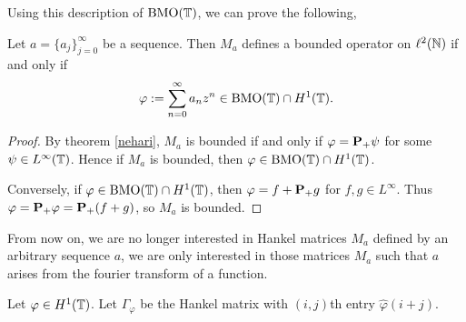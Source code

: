 Using this description of $\operatorname{BMO}(\mathbb{T})$, we can prove the following,
\begin{corollary}
    Let $a = \{a_j\}_{j=0}^\infty$ be a sequence. Then $M_a$ defines
    a bounded operator on $\ell^2(\mathbb{N})$ if and only if
    \begin{equation*}
        \varphi := \sum_{n=0}^\infty a_n z^n \in \operatorname{BMO}(\mathbb{T})\cap H^1(\mathbb{T}).
    \end{equation*}
\end{corollary}
\begin{proof}
    By theorem \ref{nehari}, $M_a$ is bounded if and only if $\varphi = \mathbf{P}_+\psi$
    for some $\psi \in L^\infty(\mathbb{T})$. Hence if $M_a$ is bounded,
    then $\varphi \in \operatorname{BMO}(\mathbb{T})\cap H^1(\mathbb{T})$. 
    
    Conversely, if $\varphi \in \operatorname{BMO}(\mathbb{T})\cap H^1(\mathbb{T})$,
    then $\varphi = f+\mathbf{P}_+g$ for $f,g \in L^\infty$. Thus
    $\varphi = \mathbf{P}_+\varphi = \mathbf{P}_+(f+g)$, so $M_a$ is bounded.
\end{proof}

From now on, we are no longer interested in Hankel matrices $M_a$ defined by an arbitrary
sequence $a$, we are only interested in those matrices $M_a$ such that $a$
arises from the fourier transform of a function. 
\begin{definition}
    Let $\varphi \in H^1(\mathbb{T})$. Let $\Gamma_\varphi$
    be the Hankel matrix with $(i,j)$th entry $\hat{\varphi}(i+j)$.
\end{definition}

